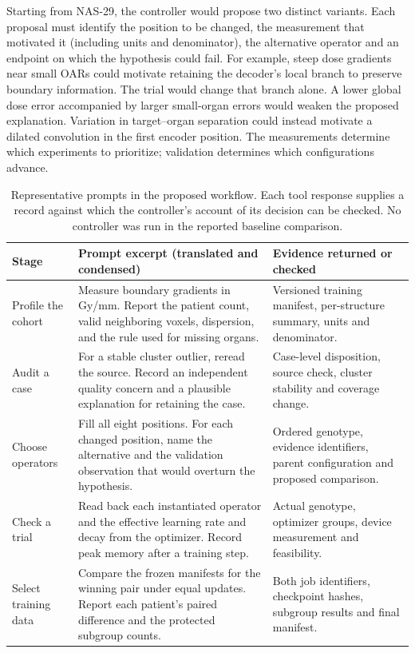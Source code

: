 \documentclass[letterpaper]{article}
\begin{document}
Starting from NAS-29, the controller would propose two distinct variants. Each proposal must identify the position to be changed, the measurement that motivated it (including units and denominator), the alternative operator and an endpoint on which the hypothesis could fail. For example, steep dose gradients near small OARs could motivate retaining the decoder's local branch to preserve boundary information. The trial would change that branch alone. A lower global dose error accompanied by larger small-organ errors would weaken the proposed explanation. Variation in target--organ separation could instead motivate a dilated convolution in the first encoder position. The measurements determine which experiments to prioritize; validation determines which configurations advance.

\begin{table}[t]
\centering
\begin{tabular}{p{1.02in}p{3.36in}p{2.06in}}
\toprule
Stage & Prompt excerpt (translated and condensed) & Evidence returned or checked\\
\midrule
Profile the cohort & Measure boundary gradients in Gy/mm. Report the patient count, valid neighboring voxels, dispersion, and the rule used for missing organs. & Versioned training manifest, per-structure summary, units and denominator.\\
Audit a case & For a stable cluster outlier, reread the source. Record an independent quality concern and a plausible explanation for retaining the case. & Case-level disposition, source check, cluster stability and coverage change.\\
Choose operators & Fill all eight positions. For each changed position, name the alternative and the validation observation that would overturn the hypothesis. & Ordered genotype, evidence identifiers, parent configuration and proposed comparison.\\
Check a trial & Read back each instantiated operator and the effective learning rate and decay from the optimizer. Record peak memory after a training step. & Actual genotype, optimizer groups, device measurement and feasibility.\\
Select training data & Compare the frozen manifests for the winning pair under equal updates. Report each patient's paired difference and the protected subgroup counts. & Both job identifiers, checkpoint hashes, subgroup results and final manifest.\\
\bottomrule
\end{tabular}
\caption{Representative prompts in the proposed workflow. Each tool response supplies a record against which the controller's account of its decision can be checked. No controller was run in the reported baseline comparison.}
\label{tab:prompts}
\end{table}
\end{document}
